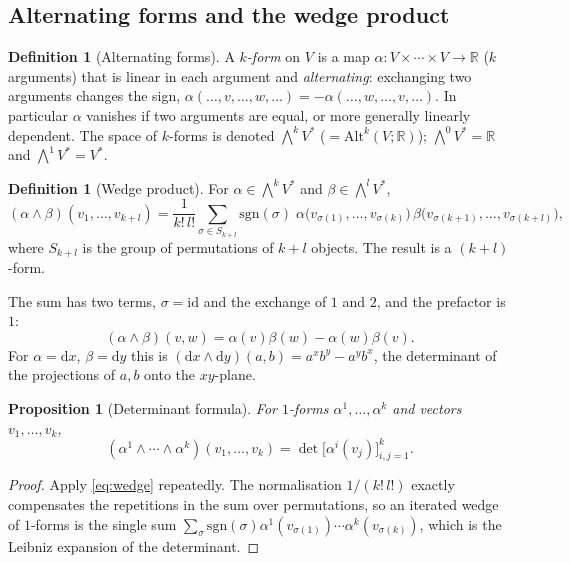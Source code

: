\documentclass[11pt,a4paper]{article}
\newcounter{thm}[section]
\numberwithin{equation}{section}
\theoremstyle{definition}
\newtheorem{definition}[thm]{Definition}
\theoremstyle{plain}
\newtheorem{proposition}[thm]{Proposition}
\newcommand{\R}{\mathbb{R}}
\newcommand{\dd}{\mathrm{d}}
\newcommand{\id}{\mathrm{id}}
\newcommand{\sgn}{\mathrm{sgn}}
\newcommand{\Alt}{\mathrm{Alt}}                    %
\begin{document}
\subsection{Alternating forms and the wedge product}\label{sec:altforms}

\begin{definition}[Alternating forms]
A \emph{$k$-form} on $V$ is a map $\alpha:V\times\cdots\times V\to\R$ ($k$ arguments) that is linear in each argument and
\emph{alternating}: exchanging two arguments changes the sign,
$\alpha(\dots,v,\dots,w,\dots)=-\alpha(\dots,w,\dots,v,\dots)$. In particular $\alpha$ vanishes if two arguments are equal,
or more generally linearly dependent. The space of $k$-forms is denoted $\bigwedge^kV^*$ ($=\Alt^k(V;\R)$); $\bigwedge^0V^*=\R$ and
$\bigwedge^1V^*=V^*$.
\end{definition}

\begin{definition}[Wedge product]
For $\alpha\in\bigwedge^kV^*$ and $\beta\in\bigwedge^lV^*$,
\begin{equation}\label{eq:wedge}
(\alpha\wedge\beta)(v_1,\dots,v_{k+l})=\frac1{k!\,l!}\sum_{\sigma\in S_{k+l}}\sgn(\sigma)\;
\alpha\bigl(v_{\sigma(1)},\dots,v_{\sigma(k)}\bigr)\,\beta\bigl(v_{\sigma(k+1)},\dots,v_{\sigma(k+l)}\bigr),
\end{equation}
where $S_{k+l}$ is the group of permutations of $k+l$ objects. The result is a $(k+l)$-form.
\end{definition}

\begin{specialcase}[$k=l=1$: the case that matters most]
The sum has two terms, $\sigma=\id$ and the exchange of $1$ and $2$, and the prefactor is $1$:
\begin{equation}\label{eq:wedge11}
(\alpha\wedge\beta)(v,w)=\alpha(v)\beta(w)-\alpha(w)\beta(v).
\end{equation}
For $\alpha=\dd x$, $\beta=\dd y$ this is $(\dd x\wedge\dd y)(a,b)=a^xb^y-a^yb^x$, the determinant of the projections of
$a,b$ onto the $xy$-plane.
\end{specialcase}

\begin{proposition}[Determinant formula]\label{prop:detformula}
For $1$-forms $\alpha^1,\dots,\alpha^k$ and vectors $v_1,\dots,v_k$,
\begin{equation}\label{eq:detformula}
(\alpha^1\wedge\cdots\wedge\alpha^k)(v_1,\dots,v_k)=\det\bigl[\alpha^i(v_j)\bigr]_{i,j=1}^k .
\end{equation}
\end{proposition}
\begin{proof}
Apply \eqref{eq:wedge} repeatedly. The normalisation $1/(k!\,l!)$ exactly compensates the repetitions in the sum over
permutations, so an iterated wedge of $1$-forms is the single sum $\sum_\sigma\sgn(\sigma)\alpha^1(v_{\sigma(1)})\cdots\alpha^k(v_{\sigma(k)})$,
which is the Leibniz expansion of the determinant.
\end{proof}
\end{document}
